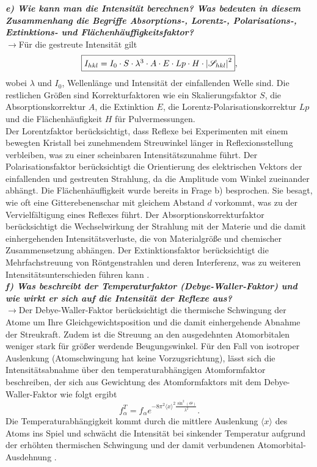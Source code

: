 \textbf{\textit{e) Wie kann man die Intensität berechnen? 
Was bedeuten in diesem Zusammenhang die Begriffe Absorptions-, Lorentz-, 
Polarisations-, Extinktions- und Flächenhäuffigkeitsfaktor?}}\\
$\rightarrow$Für die gestreute Intensität gilt \cite{Kristall}
\begin{equation}
    \fbox{$I_{hkl} = I_{0}\cdot S\cdot \lambda^{3}\cdot A\cdot E\cdot Lp\cdot H\cdot \left\vert\mathscr{S}_{hkl}\right\vert^{2}$},
\end{equation}
wobei $\lambda$ und $I_{0}$, Wellenlänge und Intensität der einfallenden Welle sind. Die restlichen Größen sind Korrekturfaktoren wie 
ein Skalierungsfaktor $S$, die Absorptionskorrektur $A$, die Extinktion $E$, die Lorentz-Polarisationskorrektur $Lp$ 
und die Flächenhäufigkeit $H$ für Pulvermessungen. \\ 
Der Lorentzfaktor berücksichtigt, dass Reflexe bei Experimenten mit einem bewegten Kristall bei 
zunehmendem Streuwinkel länger in Reflexionsstellung verbleiben, was zu einer scheinbaren Intensitätszunahme führt. 
Der Polarisationsfaktor berücksichtigt die Orientierung des elektrischen Vektors der einfallenden und gestreuten Strahlung, 
da die Amplitude vom Winkel zueinander abhängt.
Die Flächenhäuffigkeit wurde bereits in Frage b) besprochen. Sie besagt, wie oft eine Gitterebenenschar mit 
gleichem Abstand $d$ vorkommt, was zu der Vervielfältigung eines Reflexes führt. 
Der Absorptionskorrekturfaktor berücksichtigt die Wechselwirkung der Strahlung mit der Materie und die damit 
einhergehenden Intensitätsverluste, die von Materialgröße und chemischer Zusammensetzung abhängen.
Der Extinktionsfaktor berücksichtigt die Mehrfachstreuung von Röntgenstrahlen und deren Interferenz, was zu 
weiteren Intensitätsunterschieden führen kann \cite{Kristall}. \\

\textbf{\textit{f) Was beschreibt der Temperaturfaktor (Debye-Waller-Faktor) und wie
wirkt er sich auf die Intensität der Reflexe aus?}}\\
$\rightarrow$Der Debye-Waller-Faktor berücksichtigt die thermische Schwingung der Atome 
um Ihre Gleichgewichtsposition und die damit einhergehende Abnahme der Streukraft. 
Zudem ist die Streuung an den ausgedehnten Atomorbitalen weniger stark für größer werdende 
Beugungswinkel. Für den Fall von isotroper Auslenkung (Atomschwingung hat keine Vorzugsrichtung), 
lässt sich die Intensitätsabnahme über den temperaturabhängigen Atomformfaktor beschreiben, 
der sich aus Gewichtung des Atomformfaktors mit dem Debye-Waller-Faktor wie folgt ergibt 
\begin{equation}
    f_{\alpha}^{T} = f_{\alpha}e^{-8\pi^{2}\langle x\rangle^{2}\frac{\sin^{2}(\Theta)}{\lambda^{2}}}. 
\end{equation}
Die Temperaturabhängigkeit kommt durch die mittlere Auslenkung $\langle x\rangle$ des Atoms ins Spiel 
und schwächt die Intensität bei sinkender Temperatur aufgrund der erhöhten thermischen Schwingung und 
der damit verbundenen Atomorbital-Ausdehnung \cite{Kristall}. \\

